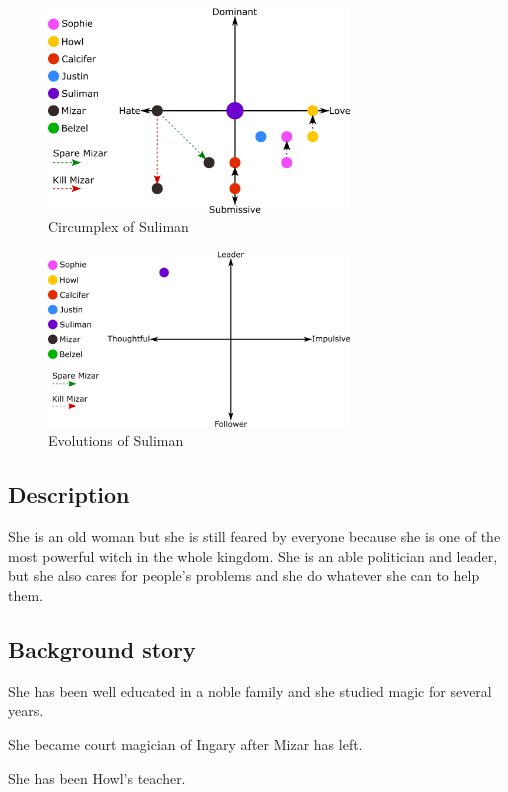 \begin{figure}[H]
  \centering
  \includegraphics[width=8cm]{Images/SVG/Exported/Circumplexes/sulimanCircumplex}
  \caption{Circumplex of Suliman}
\end{figure}

\begin{figure}[H]
  \centering
   \includegraphics[width=8cm]{Images/SVG/Exported/Evolutions/sulimanEvolution}
  \caption{Evolutions of Suliman}
\end{figure}

\subsection{Description}
She is an old woman but she is still feared by everyone because she is one of the most powerful witch in the whole kingdom. She is an able politician and leader, but she also cares for people's problems and she do whatever she can to help them.

\subsection{Background story}
She has been well educated in a noble family and she studied magic for several years.

She became court magician of Ingary after Mizar has left.

She has been Howl’s teacher.
